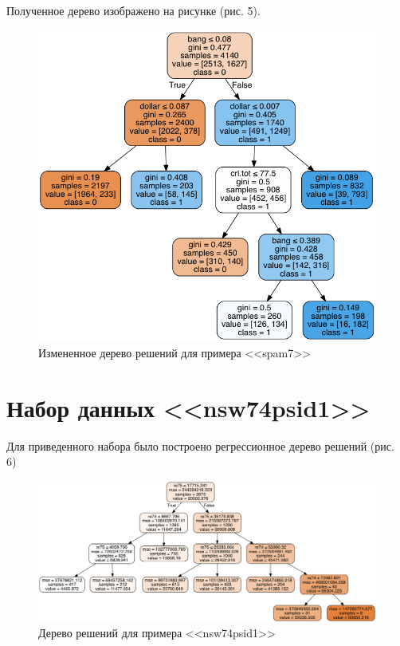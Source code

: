 \documentclass[]{article}
\numberwithin{equation}{section}
\begin{document}
        Полученное дерево изображено на рисунке (рис. 5).

        \begin{figure}[H]
            \centering
            \includegraphics[width = 0.8\linewidth]{data/spam7_opt.png}
            \caption{Измененное дерево решений для примера <<spam7>>}
        \end{figure}

    \section{Набор данных <<nsw74psid1>>}

        Для приведенного набора было построено регрессионное дерево решений (рис. 6)

        \begin{figure}[H]
            \centering
            \includegraphics[width = 1.0\linewidth]{data/nsw74psid1.png}
            \caption{Дерево решений для примера <<nsw74psid1>>}
        \end{figure}
\end{document}
